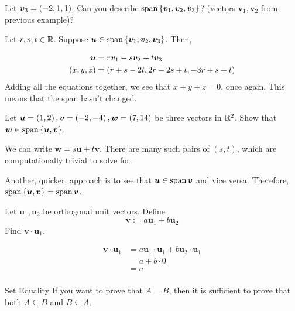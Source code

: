 \documentclass[11pt]{article}
\begin{document}
\begin{example}
  
  Let $\bm{v}_3 = \left ( -2, 1, 1 \right)$.
  Can you describe $\operatorname{span} \left \{ \bm{v}_1, \bm{v}_2, \bm{v}_3 \right \}$? (vectors $\bm{v}_1, \bm{v}_2$ from previous example)?

  Let $r, s, t \in \mathbb R$.
  Suppose $\bm{u} \in \operatorname{span} \left \{ \bm{v}_1, \bm{v}_2, \bm{v}_3 \right \}$.
  Then,

  \begin{align*}
    \bm{u} &= r \bm{v}_1 + s \bm{v}_2 + t \bm{v}_3 \\
    \left ( x, y, z \right) &= \left ( r+s-2t, 2r-2s+t, -3r+s+t \right) \\
  \end{align*}
  Adding all the equations together, we see that $x+y+z=0$, once again.
  This means that the span hasn't changed.
\end{example}

\begin{example}
  
  Let $\bm{u} = \left ( 1,2 \right), \bm{v} = \left ( -2, -4 \right), \bm{w} = \left ( 7,14 \right)$ be three vectors in $\mathbb R^2$.
  Show that $\bm{w} \in \operatorname{span} \left \{ \bm{u}, \bm{v} \right \}$.

  We can write $\bm{w} = s \bm{u} + t \bm{v}$.
  There are many such pairs of $(s,t)$, which are computationally trivial to solve for.

  Another, quicker, approach is to see that $\bm{u} \in \operatorname{span} \bm{v}$ and vice versa.
  Therefore, $\operatorname{span} \left \{ \bm{u}, \bm{v} \right \} = \operatorname{span} \bm{v} $.
\end{example}

\begin{example}

  Let $\bm{u}_1, \bm{u}_2$ be orthogonal unit vectors.
  Define
  $$
  \bm{v} := a \bm{u}_1 + b \bm{u}_2
  $$
  Find $\bm{v} \cdot \bm{u}_1$.

  \begin{align*}
    \bm{v} \cdot \bm{u}_1 &= a \bm{u}_1 \cdot \bm{u}_1 + b \bm{u}_2 \cdot \bm{u}_1 \\
                          &= a + b \cdot 0 \\
                          &= a \\
  \end{align*}
\end{example}


\begin{definition}{Set Equality}
  If you want to prove that $A = B$, then it is sufficient to prove that both $A \subseteq B$ and $B \subseteq A$.
\end{definition}
\end{document}
